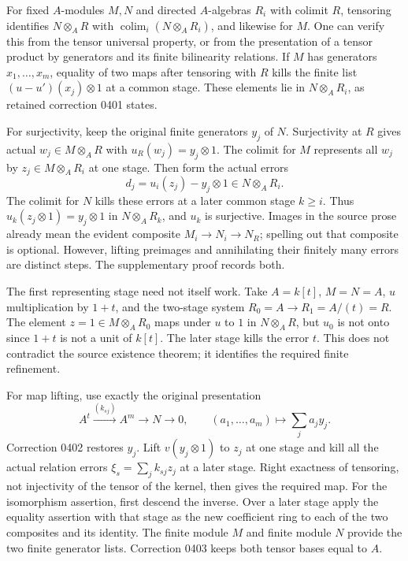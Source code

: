 For fixed \(A\)-modules \(M,N\) and directed \(A\)-algebras \(R_i\) with colimit \(R\), tensoring identifies \(N\otimes_A R\) with \(\operatorname{colim}_i(N\otimes_A R_i)\), and likewise for \(M\). One can verify this from the tensor universal property, or from the presentation of a tensor product by generators and its finite bilinearity relations. If \(M\) has generators \(x_1,\ldots,x_m\), equality of two maps after tensoring with \(R\) kills the finite list \((u-u')(x_j)\otimes1\) at a common stage. These elements lie in \(N\otimes_A R_i\), as retained correction 0401 states.

For surjectivity, keep the original finite generators \(y_j\) of \(N\). Surjectivity at \(R\) gives actual \(w_j\in M\otimes_A R\) with \(u_R(w_j)=y_j\otimes1\). The colimit for \(M\) represents all \(w_j\) by \(z_j\in M\otimes_A R_i\) at one stage. Then form the actual errors \[
d_j=u_i(z_j)-y_j\otimes1\in N\otimes_A R_i.
\] The colimit for \(N\) kills these errors at a later common stage \(k\ge i\). Thus \(u_k(z_j\otimes1)=y_j\otimes1\) in \(N\otimes_A R_k\), and \(u_k\) is surjective. Images in the source prose already mean the evident composite \(M_i\to N_i\to N_R\); spelling out that composite is optional. However, lifting preimages and annihilating their finitely many errors are distinct steps. The supplementary proof records both.

The first representing stage need not itself work. Take \(A=k[t]\), \(M=N=A\), \(u\) multiplication by \(1+t\), and the two-stage system \(R_0=A\to R_1=A/(t)=R\). The element \(z=1\in M\otimes_A R_0\) maps under \(u\) to \(1\) in \(N\otimes_A R\), but \(u_0\) is not onto since \(1+t\) is not a unit of \(k[t]\). The later stage kills the error \(t\). This does not contradict the source existence theorem; it identifies the required finite refinement.

For map lifting, use exactly the original presentation \[
A^t\xrightarrow{(k_{sj})}A^m\longrightarrow N\longrightarrow0,
\qquad (a_1,\ldots,a_m)\longmapsto\sum_j a_jy_j.
\] Correction 0402 restores \(y_j\). Lift \(v(y_j\otimes1)\) to \(z_j\) at one stage and kill all the actual relation errors \(\xi_s=\sum_jk_{sj}z_j\) at a later stage. Right exactness of tensoring, not injectivity of the tensor of the kernel, then gives the required map. For the isomorphism assertion, first descend the inverse. Over a later stage apply the equality assertion with that stage as the new coefficient ring to each of the two composites and its identity. The finite module \(M\) and finite module \(N\) provide the two finite generator lists. Correction 0403 keeps both tensor bases equal to \(A\).

